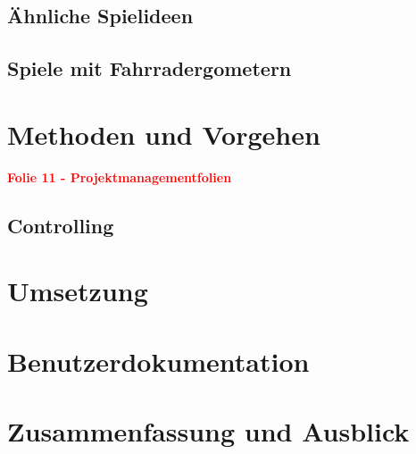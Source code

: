 \section{Ähnliche Spielideen}

\section{Spiele mit Fahrradergometern}
\label{StateOfTheArt}


\chapter{Methoden und Vorgehen}
\textcolor{red}{\textbf{Folie 11 - Projektmanagementfolien}}
\section{Controlling}



\chapter{Umsetzung}

\chapter{Benutzerdokumentation}

\chapter{Zusammenfassung und Ausblick}
